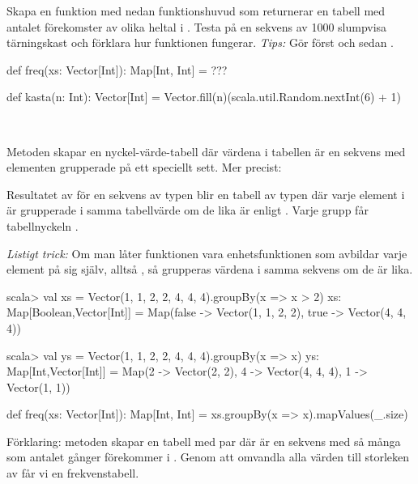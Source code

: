 \Subtask Skapa en funktion  med nedan funktionshuvud som returnerar en tabell med antalet förekomster av olika heltal i . Testa  på en sekvens av 1000 slumpvisa tärningskast och förklara hur funktionen  fungerar. \emph{Tips:} Gör först  och sedan .

\begin{Code}
def freq(xs: Vector[Int]): Map[Int, Int] = ???

def kasta(n: Int): Vector[Int] =
  Vector.fill(n)(scala.util.Random.nextInt(6) + 1)
\end{Code}

\SOLUTION

\TaskSolved \what~

\SubtaskSolved Metoden  skapar en nyckel-värde-tabell där värdena i tabellen är en sekvens med elementen grupperade på ett speciellt sett.
Mer precist:

Resultatet av  för en sekvens  av typen  blir en tabell av typen  där varje element  i  är grupperade i samma tabellvärde om de lika är enligt . Varje grupp får tabellnyckeln .

\emph{Listigt trick:} Om man låter funktionen  vara enhetsfunktionen som avbildar varje element på sig själv, alltså , så grupperas värdena i samma sekvens om de är lika.

\begin{REPL}
scala> val xs = Vector(1, 1, 2, 2, 4, 4, 4).groupBy(x => x > 2)
xs: Map[Boolean,Vector[Int]] =
  Map(false -> Vector(1, 1, 2, 2), true -> Vector(4, 4, 4))

scala> val ys = Vector(1, 1, 2, 2, 4, 4, 4).groupBy(x => x)
ys: Map[Int,Vector[Int]] =
  Map(2 -> Vector(2, 2), 4 -> Vector(4, 4, 4), 1 -> Vector(1, 1))
\end{REPL}


\SubtaskSolved

\begin{Code}
def freq(xs: Vector[Int]): Map[Int, Int] =
  xs.groupBy(x => x).mapValues(_.size)
\end{Code}
Förklaring: metoden  skapar en tabell med par  där  är en sekvens med så många  som antalet gånger  förekommer i . Genom att omvandla alla värden  till storleken av  får vi en frekvenstabell.

